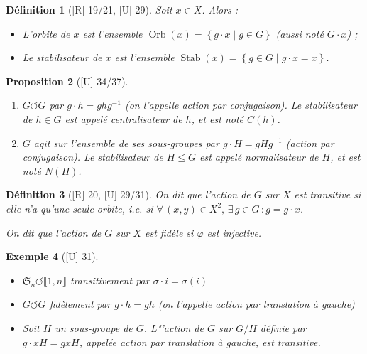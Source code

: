 \documentclass[10pt, a4paper, parskip=full, twoside, twocolumn]{report}
\newtheorem{definition}{Définition}
\newtheorem{proposition}[definition]{Proposition}
\newtheorem{example}[definition]{Exemple}
\newcommand{\actson}{\circlearrowleft}
\DeclareMathOperator{\Orb}{Orb}
\DeclareMathOperator{\Stab}{Stab}
\begin{document}
\begin{definition}[\textnormal{[R] 19/21, [U] 29}]
	Soit $x\in X$. Alors :
	\begin{itemize}
		\item L'\emph{orbite} de $x$ est l'ensemble $\Orb(x) = \left\{g\cdot x \mid g\in G\right\}$ (aussi noté $G\cdot x$) ;
		\item Le \emph{stabilisateur} de $x$ est l'ensemble $\Stab(x) = \left\{g\in G \mid g\cdot x = x\right\}$.
	\end{itemize}
\end{definition}

\begin{proposition}[\textnormal{[U] 34/37}]
	\begin{enumerate}
		\item $G\actson G$ par $g\cdot h=ghg^{-1}$ (on l'appelle \emph{action par conjugaison}). Le stabilisateur de $h\in G$ est appelé \emph{centralisateur} de $h$, et est noté $C(h)$.
		\item $G$ agit sur l'ensemble de ses sous-groupes par $g\cdot H = gHg^{-1}$ (action par conjugaison). Le stabilisateur de $H\leq G$ est appelé \emph{normalisateur} de $H$, et est noté $N(H)$.
	\end{enumerate}
\end{proposition}

\begin{definition}[\textnormal{[R] 20, [U] 29/31}]
	On dit que l'action de $G$ sur $X$ est \emph{transitive} si elle n'a qu'une seule orbite, \emph{i.e.} si $\forall\,(x,y)\in X^2,\, \exists\, g\in G\,\colon g=g\cdot x$.

	On dit que l'action de $G$ sur $X$ est \emph{fidèle} si $\varphi$ est injective.
\end{definition}

\begin{example}[\textnormal{[U] 31}]
	\begin{itemize}
		\item $\mathfrak{S}_n\actson \llbracket 1,n\rrbracket$ transitivement par $\sigma\cdot i=\sigma(i)$
		\item $G\actson G$ fidèlement par $g\cdot h = gh$ (on l'appelle \emph{action par translation à gauche})
		\item Soit $H$ un sous-groupe de $G$. L"'action de $G$ sur $G/H$ définie par $g\cdot xH = gxH$, appelée \emph{action par translation à gauche}, est transitive.
	\end{itemize}
\end{example}
\end{document}
